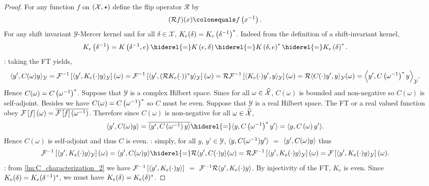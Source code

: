 \begin{proof}
    For any function $f$ on $(\mathcal{X},\star)$ define the flip operator
    $\mathcal{R}$ by
    \begin{dmath*}
        (\mathcal{R}f)(x) \colonequals f\left(\inv{x}\right).
    \end{dmath*}
    For any shift invariant $\mathcal{Y}$-Mercer kernel and for all
    $\delta\in\mathcal{X}$,
    $K_e(\delta)=K_e\left({\delta}^{-1}\right)^*$. Indeed from the
    definition of a shift-invariant kernel, 
    \begin{dmath*}
        K_e\left(\inv{\delta}\right)=K\left(\inv{\delta},e\right)
        \hiderel{=}K\left(e,\delta\right)
        \hiderel{=}K\left(\delta,e\right)^\adjoint
        \hiderel{=}K_e\left(\delta\right)^\adjoint.
    \end{dmath*}
    : taking the \acl{FT} yields, 
    \begin{dmath*}
        \inner{y',C(\omega)y}_{\mathcal{Y}}=\IFT{\inner{y',
        K_e(\cdot)y}_{\mathcal{Y}}}(\omega)
        =\IFT{\inner{y', (\mathcal{R}K_e(\cdot))^\adjoint
        y}_{\mathcal{Y}}}(\omega)
        =\mathcal{R}\IFT{\inner{K_e(\cdot)y', y}_{\mathcal{Y}}}(\omega)
        =\mathcal{R}\inner{C(\cdot)y',y}_{\mathcal{Y}}(\omega)
        =\inner*{y',C\left(\inv{\omega}\right)^\adjoint y}_{\mathcal{Y}}.
    \end{dmath*}
    Hence $C(\omega)=C\left({\omega}^{-1}\right)^*$. Suppose that
    $\mathcal{Y}$ is a complex Hilbert space. Since for all
    $\omega\in\mathcal{\widehat{X}}$, $C(\omega)$ is bounded and non-negative so
    $C(\omega)$ is self-adjoint. Besides we have
    $C(\omega)=C\left({\omega}^{-1}\right)^* $ so $C$ must be even.
    Suppose that $\mathcal{Y}$ is a real Hilbert space. The \acl{FT} or a real
    valued function obey
    $\mathcal{F}\left[f\right](\omega)=\overline{\mathcal{F}\left[f\right]\left({\omega}^{-1}\right)}$. Therefore since
    $C(\omega)$ is non-negative for all $\omega\in\widehat{\mathcal{X}}$,
    \begin{dmath*}
        \inner{y', C(\omega)y}
        = \conj{\inner{y', C\left(\inv{\omega}\right)y}}
        \hiderel{=}\inner{y, C\left(\inv{\omega}\right)^* y'}
        =\inner{y, C\left(\omega\right) y'}.
    \end{dmath*}
    Hence $C(\omega)$ is self-adjoint and thus $C$ is even.
    : simply, for all $y$, $y'\in\mathcal{Y}$,
    $\langle y, C({\omega}^{-1})y'\rangle$ $=$ $\langle y', C(\omega)y\rangle$ thus
    \begin{dmath*}
        \IFT{\inner{y', K_e(\cdot)y}_{\mathcal{Y}}}(\omega)=\inner{y',
        C(\omega)y}\hiderel{=}\mathcal{R}\inner{y',
        C(\cdot)y}(\omega)=\mathcal{R}\IFT{\inner{y',
        K_e(\cdot)y}_{\mathcal{Y}}}(\omega)=\FT{\inner{y',
        K_e(\cdot)y}_{\mathcal{Y}}}(\omega).
    \end{dmath*}
    : from \cref{lm:C_characterization_2} we have
    $\mathcal{F}^{-1}\left[\langle y', K_e(\cdot)y\rangle\right]$ $=$ $\mathcal{F}^{-1}\mathcal{R}{\langle y',
    K_e(\cdot)y\rangle}$. By injectivity of the \acl{FT}, $K_e$ is even. Since
    $K_e(\delta)=K_e({\delta}^{-1})^* $, we must have
    $K_e(\delta)=K_e(\delta)^* $.
\end{proof}
